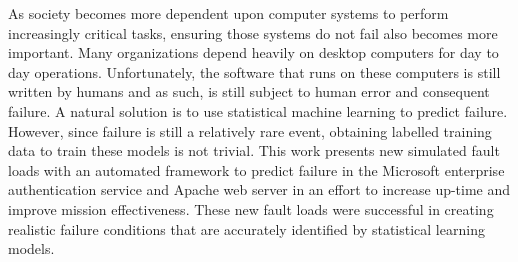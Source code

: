As society becomes more dependent upon computer systems to perform increasingly
critical tasks, ensuring those systems do not fail also becomes more important.
Many organizations depend heavily on desktop computers for day to day
operations. Unfortunately, the software that runs on these computers is still
written by humans and as such, is still subject to human error and consequent
failure. A natural solution is to use statistical machine learning to predict
failure. However, since failure is still a relatively rare event, obtaining
labelled training data to train these models is not trivial. This work presents
new simulated fault loads with an automated framework to predict failure in the
Microsoft enterprise authentication service and Apache web server in an effort
to increase up-time and improve mission effectiveness.  These new fault loads
were successful in creating realistic failure conditions that are accurately
identified by statistical learning models.
